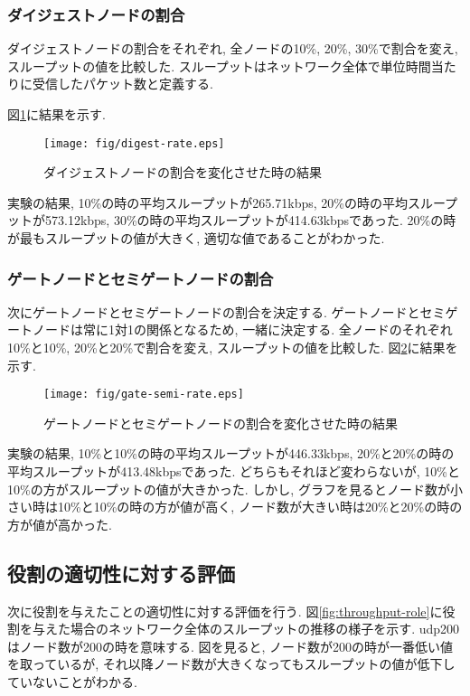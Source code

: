 \subsubsection{ダイジェストノードの割合}
ダイジェストノードの割合をそれぞれ, 全ノードの10\%, 20\%, 30\%で割合を変え, スループットの値を比較した. スループットはネットワーク全体で単位時間当たりに受信したパケット数と定義する.

図\ref{fig:digest-rate}に結果を示す.

\newpage

\begin{figure}[h]
  \centering
  \texttt{[image: fig/digest-rate.eps]}
  \caption{ダイジェストノードの割合を変化させた時の結果}
  \label{fig:digest-rate}
\end{figure}

実験の結果, 10\%の時の平均スループットが265.71kbps, 20\%の時の平均スループットが573.12kbps, 30\%の時の平均スループットが414.63kbpsであった. 20\%の時が最もスループットの値が大きく, 適切な値であることがわかった.

\subsubsection{ゲートノードとセミゲートノードの割合}
次にゲートノードとセミゲートノードの割合を決定する. ゲートノードとセミゲートノードは常に1対1の関係となるため, 一緒に決定する. 全ノードのそれぞれ10\%と10\%, 20\%と20\%で割合を変え, スループットの値を比較した. 図\ref{fig:gate-semi-rate}に結果を示す.

\begin{figure}[h]
  \centering
  \texttt{[image: fig/gate-semi-rate.eps]}
  \caption{ゲートノードとセミゲートノードの割合を変化させた時の結果}
  \label{fig:gate-semi-rate}
\end{figure}

実験の結果, 10\%と10\%の時の平均スループットが446.33kbps, 20\%と20\%の時の平均スループットが413.48kbpsであった. どちらもそれほど変わらないが, 10\%と10\%の方がスループットの値が大きかった. しかし, グラフを見るとノード数が小さい時は10\%と10\%の時の方が値が高く, ノード数が大きい時は20\%と20\%の時の方が値が高かった.

\subsection{役割の適切性に対する評価}\label{subsec:eval-role}
次に役割を与えたことの適切性に対する評価を行う. 図\ref{fig:throughput-role}に役割を与えた場合のネットワーク全体のスループットの推移の様子を示す. udp200はノード数が200の時を意味する. 図を見ると, ノード数が200の時が一番低い値を取っているが, それ以降ノード数が大きくなってもスループットの値が低下していないことがわかる.


